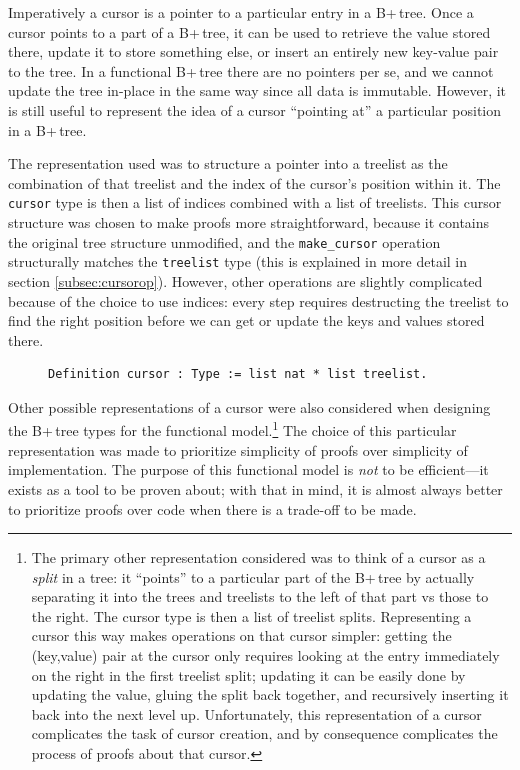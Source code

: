 \documentclass[a4paper,12pt]{article}
\begin{document}
Imperatively a cursor is a pointer to a particular entry in a B+\,tree. Once a cursor points to a part of a B+\,tree, it can be used to retrieve the value stored there, update it to store something else, or insert an entirely new key-value pair to the tree. In a functional B+\,tree there are no pointers per se, and we cannot update the tree in-place in the same way since all data is immutable. However, it is still useful to represent the idea of a cursor “pointing at” a particular position in a B+\,tree.

The representation used was to structure a pointer into a treelist as the combination of that treelist and the index of the cursor’s position within it. The \texttt{cursor} type is then a list of indices combined with a list of treelists. This cursor structure was chosen to make proofs more straightforward, because it contains the original tree structure unmodified, and the \texttt{make\_cursor} operation structurally matches the \texttt{treelist} type (this is explained in more detail in section \ref{subsec:cursorop}). However, other operations are slightly complicated because of the choice to use indices: every step requires destructing the treelist to find the right position before we can get or update the keys and values stored there.

\begin{figure}[h]
\begin{singlespace}
\begin{verbatim}
Definition cursor : Type := list nat * list treelist.
\end{verbatim}
\end{singlespace}
\end{figure}

Other possible representations of a cursor were also considered when designing the B+\,tree types for the functional model.\footnote{The primary other representation considered was to think of a cursor as a \textit{split} in a tree: it “points” to a particular part of the B+\,tree by actually separating it into the trees and treelists to the left of that part vs those to the right. The cursor type is then a list of treelist splits. Representing a cursor this way makes operations on that cursor simpler: getting the (key,value) pair at the cursor only requires looking at the entry immediately on the right in the first treelist split; updating it can be easily done by updating the value, gluing the split back together, and recursively inserting it back into the next level up. Unfortunately, this representation of a cursor complicates the task of cursor creation, and by consequence complicates the process of proofs about that cursor.} The choice of this particular representation was made to prioritize simplicity of proofs over simplicity of implementation. The purpose of this functional model is \textit{not} to be efficient---it exists as a tool to be proven about; with that in mind, it is almost always better to prioritize proofs over code when there is a trade-off to be made.
\end{document}

